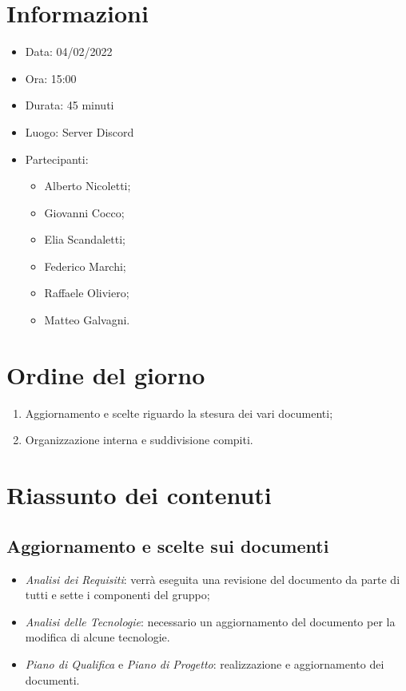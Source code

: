 \documentclass[a4paper, 12pt]{article}
\begin{document}
\makefrontpage

\section{Informazioni}

\begin{itemize}
\item Data: 04/02/2022
\item Ora: 15:00
\item Durata: 45 minuti
\item Luogo: Server Discord
\item Partecipanti:
\begin{itemize}
\item Alberto Nicoletti;
\item Giovanni Cocco;
\item Elia Scandaletti;
\item Federico Marchi;
\item Raffaele Oliviero;
\item Matteo Galvagni.
\end{itemize}
\end{itemize}

\section{Ordine del giorno}
\begin{enumerate}
    \item Aggiornamento e scelte riguardo la stesura dei vari documenti;
    \item Organizzazione interna e suddivisione compiti.
\end{enumerate}

\section{Riassunto dei contenuti}

\subsection{Aggiornamento e scelte sui documenti}
\begin{itemize}
    \item \textit{Analisi dei Requisiti}: verrà eseguita una revisione del documento da parte di tutti e sette i componenti del gruppo;
    \item \textit{Analisi delle Tecnologie}: necessario un aggiornamento del documento per la modifica di alcune tecnologie.
    \item \textit{Piano di Qualifica} e \textit{Piano di Progetto}: realizzazione e aggiornamento dei documenti.
\end{itemize}
\end{document}
